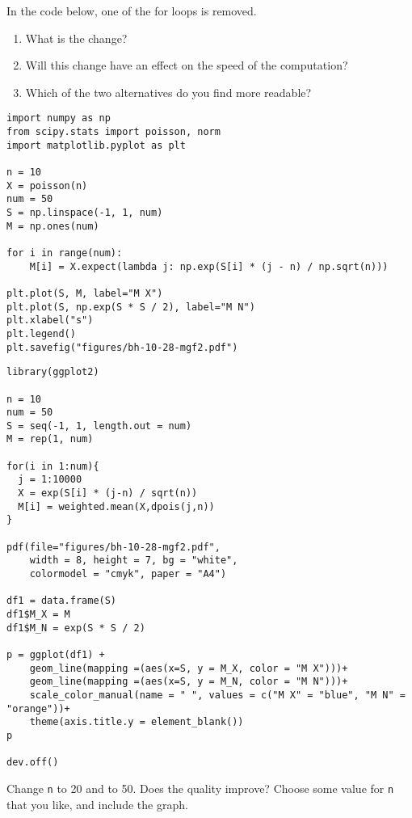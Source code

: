 \begin{exercise}
In the code below, one of the for loops is removed.
\begin{enumerate}
\item What is the change?
\item Will this change have an effect on the speed of the computation?
\item Which of the two alternatives do you find more readable?
\end{enumerate}
\end{exercise}


\begin{verbatim}
import numpy as np
from scipy.stats import poisson, norm
import matplotlib.pyplot as plt

n = 10
X = poisson(n)
num = 50
S = np.linspace(-1, 1, num)
M = np.ones(num)

for i in range(num):
    M[i] = X.expect(lambda j: np.exp(S[i] * (j - n) / np.sqrt(n)))

plt.plot(S, M, label="M X")
plt.plot(S, np.exp(S * S / 2), label="M N")
plt.xlabel("s")
plt.legend()
plt.savefig("figures/bh-10-28-mgf2.pdf")
\end{verbatim}

\begin{verbatim}
library(ggplot2)  

n = 10
num = 50
S = seq(-1, 1, length.out = num)
M = rep(1, num)

for(i in 1:num){
  j = 1:10000
  X = exp(S[i] * (j-n) / sqrt(n))
  M[i] = weighted.mean(X,dpois(j,n))
}

pdf(file="figures/bh-10-28-mgf2.pdf",
    width = 8, height = 7, bg = "white",          
    colormodel = "cmyk", paper = "A4")

df1 = data.frame(S)
df1$M_X = M
df1$M_N = exp(S * S / 2)

p = ggplot(df1) +
    geom_line(mapping =(aes(x=S, y = M_X, color = "M X")))+
    geom_line(mapping =(aes(x=S, y = M_N, color = "M N")))+
    scale_color_manual(name = " ", values = c("M X" = "blue", "M N" = "orange"))+
    theme(axis.title.y = element_blank())
p

dev.off()
\end{verbatim}

\begin{exercise}
Change \texttt{n} to 20 and to 50. Does the quality improve? Choose some value for \texttt{n} that you like, and include the graph.
\end{exercise}



